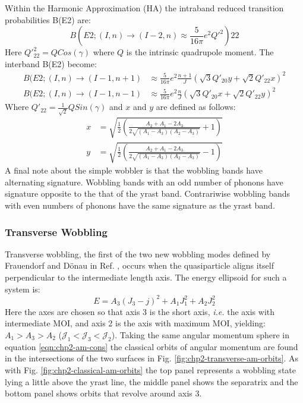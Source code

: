 Within the Harmonic Approximation (HA) the intraband reduced transition probabilities B(E2) \cite{wobblingGeometry} are:
\begin{equation}
\label{eqn:chp2-simple-wobb-intraband-e2-red-mat}
B(E2;(I,n)\rightarrow(I-2,n)\approx\frac{5}{16\pi}e^2Q'^2){22}
\end{equation}
Here $Q'^2_{22}=QCos(\gamma)$ where $Q$ is the intrinsic quadrupole moment. The interband B(E2) \cite{wobblingGeometry} become:
\begin{align}
\label{eqn:chp2-simple-wobb-interband-e2-red-mat}
B(E2;(I,n)\rightarrow(I-1,n+1)&\approx\frac{5}{16\pi}e^2\frac{n+1}{J}\left(\sqrt{3}Q'_{20}y+\sqrt{2}Q'_{22}x\right)^2\\
B(E2;(I,n)\rightarrow(I-1,n-1)&\approx\frac{5}{16\pi}e^2\frac{n}{J}\left(\sqrt{3}Q'_{20}x+\sqrt{2}Q'_{22}y\right)^2
\end{align}
Where $Q'_{22}=\frac{1}{\sqrt{2}}QSin(\gamma)$ and $x$ and $y$ are defined as follows:
\begin{align}
\label{eqn:chp2-simple-wobb-x-y-params}
x&=\sqrt{\frac{1}{2}\left(\frac{A_2+A_1-2A_3}{2\sqrt{(A_1-A_3)(A_2-A_3)}}+1\right)}\\
y&=\sqrt{\frac{1}{2}\left(\frac{A_2+A_1-2A_3}{2\sqrt{(A_1-A_3)(A_2-A_3)}}-1\right)}\nonumber
\end{align}
A final note about the simple wobbler is that the wobbling bands have alternating signature. Wobbling bands with an odd number of phonons have signature opposite to the that of the yrast band. Contrariwise wobbling bands with even numbers of phonons have the same signature as the yrast band.

\subsubsection{Transverse Wobbling}
\label{sssec:models-wobbling-transverse-wobbling}
Transverse wobbling, the first of the two new wobbling modes defined by Frauendorf and D\"onau in Ref. \cite{frauendorfTAC}, occurs when the quasiparticle aligns itself perpendicular to the intermediate length axis. The energy ellipsoid for such a system is:
\begin{equation}
\label{eqn:chp2-transverse-en-ellipsoid}
E=A_3(J_3-j)^2 + A_1J_1^2 + A_2J_2^2
\end{equation}
Here the axes are chosen so that axis 3 is the short axis, \emph{i.e.} the axis with intermediate MOI, and axis 2 is the axis with maximum MOI, yielding: $A_1>A_3>A_2$ ($\mathcal{J}_1<\mathcal{J}_3<\mathcal{J}_2$). Taking the same angular momentum sphere in equation \ref{eqn:chp2-am-cons} the classical orbits of angular momentum are found in the intersections of the two surfaces in Fig. \ref{fig:chp2-transverse-am-orbits}. As with Fig. \ref{fig:chp2-classical-am-orbits} the top panel represents a wobbling state lying a little above the yrast line, the middle panel shows the separatrix and the bottom panel shows orbits that revolve around axis 3.

